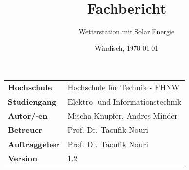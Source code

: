 \documentclass[final]{fhnwreport}       %
\title{\Huge{\textbf{Fachbericht}}\\}          %
\author{\huge{Wetterstation mit Solar Energie}}          %
\date{Windisch, \today}             %
\begin{document}
\maketitle
\vspace*{-0.5cm}						    %
\vfill
\begin{figure}[H]
\centering
\end{figure}
\vfill

{
\renewcommand\arraystretch{2}
\begin{center}
\begin{tabular}{>{\bf}p{4cm} l}
Hochschule                 &    Hochschule für Technik - FHNW\\
Studiengang                &    Elektro- und Informationstechnik\\
Autor/-en  		           & 	Mischa Knupfer, Andres Minder\\
Betreuer                   &    Prof. Dr. Taoufik Nouri\\
Auftraggeber               &    Prof. Dr. Taoufik Nouri\\
Version                    &    1.2 %
\end{tabular}
\end{center}
}

\clearpage
			
\thispagestyle{empty}


\tableofcontents
\clearpage
















\end{document}
